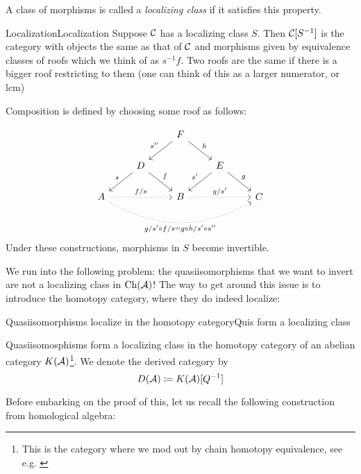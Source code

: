 A class of morphisms is called a \emph{localizing class} if it satisfies this property.

\begin{definition}{Localization}{Localization}
    Suppose $\mathcal{C}$ has a localizing class $S$. Then $\mathcal{C}[S^{-1}]$ is the category with objects the same as that of $\mathcal{C}$ and morphisms given by equivalence classes of roofs which we think of as $s^{-1}f$. Two roofs are the same if there is a bigger roof restricting to them (one can think of this as a larger numerator, or lcm)
\end{definition}

Composition is defined by choosing some roof as follows:

\[\begin{tikzcd}
    &                                    & F \arrow[ld, "s''"'] \arrow[rd, "h"] &                                     &   \\
    & D \arrow[ld, "s"'] \arrow[rd, "f"] &                                      & E \arrow[ld, "s'"'] \arrow[rd, "g"] &   \\
A \arrow[rr, "f/s", dotted] \arrow[rrrr, "g/s' \circ f/s=g\circ h/ s'\circ s''"', dotted, bend right] &                                    & B \arrow[rr, "g/s'", dotted]         &                                     & C
\end{tikzcd}\]
Under these constructions, morphisms in $S$ become invertible.

We run into the following problem: the quasiisomorphisms that we want to invert are not a localizing class in $\mathrm{Ch}(\mathcal{A})$! The way to get around this issue is to introduce the homotopy category, where they do indeed localize:

\begin{theorem}{Quasiisomorphisms localize in the homotopy category}{Quis form a localizing class}

    Quasiisomosphisms form a localizing class in the homotopy category of an abelian category $K(\mathcal{A})$\footnote[1]{This is the category where we mod out by chain homotopy equivalence, see e.g. \cite{Weibel}}. We denote the derived category by
    \begin{equation*}
        D(\mathcal{A})\coloneqq K(\mathcal{A})[Q^{-1}]
    \end{equation*}
\end{theorem}


Before embarking on the proof of this, let us recall the following construction from homological algebra:

